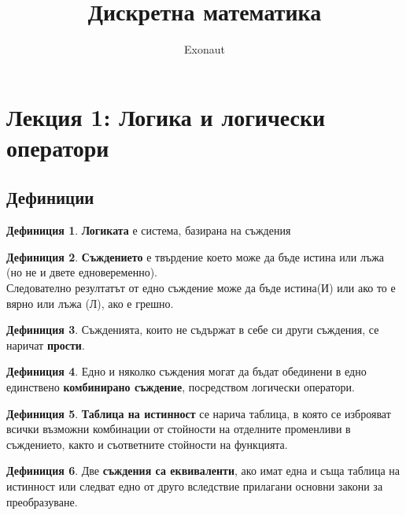 \documentclass[fleqn, 12pt]{article}
\title{Дискретна математика}
\author{Exonaut}
\theoremstyle{definition}
\newtheorem{definition}{Дефиниция}[subsection]
\begin{document}
\maketitle
{}

\newpage
{}

\tableofcontents
\newpage

\section{Лекция 1: Логика и логически оператори}

\subsection{Дефиниции}

\begin{definition}
\textbf{Логиката} е система, базирана на съждения
\end{definition}

\begin{definition}
\textbf{Съждението} е твърдение което може да бъде истина или лъжа (но не и двете едновеременно).\\
Следователно резултатът от едно съждение може да бъде истина(И) или ако то е вярно или лъжа (Л), ако е грешно.
\end{definition}

\begin{definition}
Съжденията, които не съдържат в себе си други съждения, се наричат \textbf{прости}.
\end{definition}

\begin{definition}
Едно и няколко съждения могат да бъдат обединени в едно единствено \textbf{комбинирано съждение}, посредством логически оператори. 
\end{definition}

\begin{definition}
\textbf{Таблица на истинност} се нарича таблица, в която се изброяват всички възможни комбинации от стойности  на отделните променливи в съждението, както и съответните стойности на функцията. 
\end{definition}

\begin{definition}
Две \textbf{съждения са еквиваленти}, ако имат една и съща таблица на истинност или следват едно от друго вследствие прилагани основни закони за преобразуване. 
\end{definition}
\newpage
\end{document}
